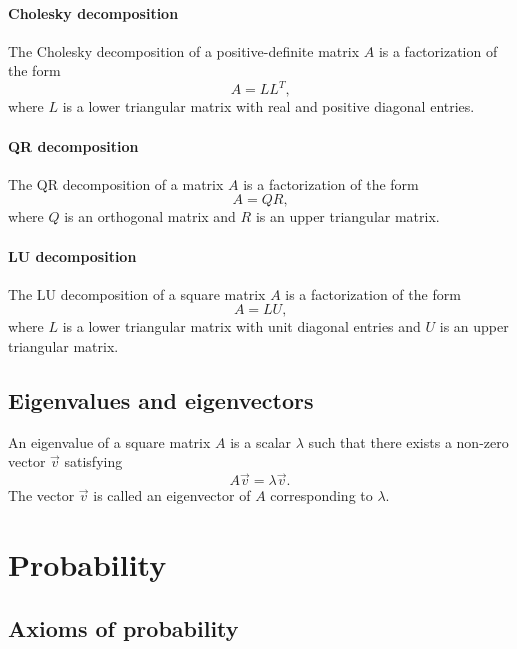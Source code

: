 \paragraph{Cholesky decomposition}  The Cholesky decomposition of a positive-definite
matrix $A$ is a factorization of the form
\begin{equation}
  \label{eq:chol}
  A = L L^T\text{,}
\end{equation}
where $L$ is a lower triangular matrix with real and positive diagonal entries.

\paragraph{QR decomposition}  The QR decomposition of a matrix $A$ is a
factorization of the form
\begin{equation}
  \label{eq:qr}
  A = Q R\text{,}
\end{equation}
where $Q$ is an orthogonal matrix and $R$ is an upper triangular matrix.

\paragraph{LU decomposition}  The LU decomposition of a square matrix $A$ is a
factorization of the form
\begin{equation}
  \label{eq:lu}
  A = L U\text{,}
\end{equation}
where $L$ is a lower triangular matrix with unit diagonal entries and $U$ is
an upper triangular matrix.

\subsection{Eigenvalues and eigenvectors}

An eigenvalue of a square matrix $A$ is a scalar $\lambda$ such that there exists a
non-zero vector $\vec{v}$ satisfying
\begin{equation}
  \label{eq:eig}
  A \vec{v} = \lambda \vec{v}\text{.}
\end{equation}
The vector $\vec{v}$ is called an eigenvector of $A$ corresponding to $\lambda$.

\section{Probability}

\subsection{Axioms of probability}

